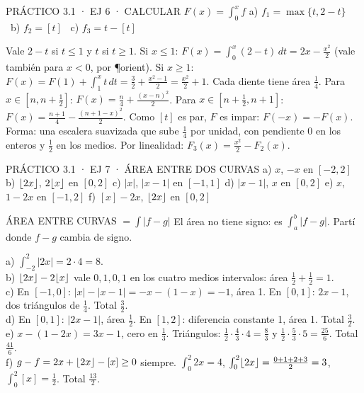 \begin{enunciado}{PRÁCTICO 3.1 · EJ 6 · CALCULAR $F(x)=\int_0^xf$}
a) $f_1=\max\{t,2-t\}$ \ b) $f_2=[t]$ \ c) $f_3=t-[t]$
\end{enunciado}
Vale $2-t$ si $t\le1$ y $t$ si $t\ge1$. Si $x\le1$: $F(x)=\int_0^x(2-t)\,dt=2x-\frac{x^2}2$ (vale también para $x<0$, por \P{orient}). Si $x\ge1$: $F(x)=F(1)+\int_1^xt\,dt=\frac32+\frac{x^2-1}2=\frac{x^2}2+1$.
Cada diente tiene área $\frac14$. Para $x\in[n,n+\frac12]$: $F(x)=\frac n4+\frac{(x-n)^2}2$. Para $x\in[n+\frac12,n+1]$: $F(x)=\frac{n+1}4-\frac{(n+1-x)^2}2$. Como $[t]$ es par, $F$ es impar: $F(-x)=-F(x)$.\\
Forma: una escalera suavizada que sube $\frac14$ por unidad, con pendiente 0 en los enteros y $\frac12$ en los medios.
Por linealidad: $F_3(x)=\frac{x^2}2-F_2(x)$.

\begin{enunciado}{PRÁCTICO 3.1 · EJ 7 · ÁREA ENTRE DOS CURVAS}
a) $x$, $-x$ en $[-2,2]$ b) $\lfloor 2x\rfloor$, $2\lfloor x\rfloor$ en $[0,2]$ c) $|x|$, $|x-1|$ en $[-1,1]$ d) $|x-1|$, $x$ en $[0,2]$ e) $x$, $1-2x$ en $[-1,2]$ f) $[x]-2x$, $\lfloor 2x\rfloor$ en $[0,2]$
\end{enunciado}
\begin{uso}{ÁREA ENTRE CURVAS $=\int|f-g|$}
El área no tiene signo: es $\int_a^b|f-g|$. Partí donde $f-g$ cambia de signo.
\end{uso}
a) $\int_{-2}^2|2x|=2\cdot4=8$.\\
b) $\lfloor 2x\rfloor-2\lfloor x\rfloor$ vale $0,1,0,1$ en los cuatro medios intervalos: área $\frac12+\frac12=1$.\\
c) En $[-1,0]$: $|x|-|x-1|=-x-(1-x)=-1$, área 1. En $[0,1]$: $2x-1$, dos triángulos de $\frac14$. Total $\frac32$.\\
d) En $[0,1]$: $|2x-1|$, área $\frac12$. En $[1,2]$: diferencia constante 1, área 1. Total $\frac32$.\\
e) $x-(1-2x)=3x-1$, cero en $\frac13$. Triángulos: $\frac12\cdot\frac43\cdot4=\frac83$ y $\frac12\cdot\frac53\cdot5=\frac{25}6$. Total $\frac{41}6$.\\
f) $g-f=2x+\lfloor 2x\rfloor-[x]\ge0$ siempre. $\int_0^2 2x=4$, $\int_0^2\lfloor 2x\rfloor=\frac{0+1+2+3}2=3$, $\int_0^2[x]=\frac12$. Total $\frac{13}2$.

